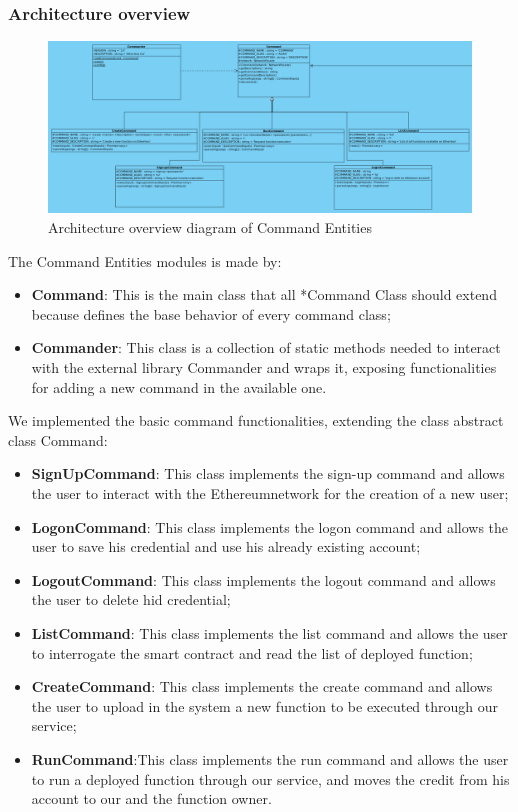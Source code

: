 \subsubsection{Architecture overview}
\begin{figure}[h]
	\centering
	\includegraphics[width=\textwidth]{./res/img/CommandEntities.png}
	\caption{Architecture overview diagram of Command Entities}
\end{figure}
\noindent The Command Entities modules is made by:
\begin{itemize}
    \item \textbf{Command}: This is the main class that all *Command Class should extend because defines the base behavior of every command class;
    \item \textbf{Commander}: This class is a collection of static methods needed to interact with the external library Commander and wraps it, exposing functionalities for adding a new command in the available one.
\end{itemize}
We implemented the basic command functionalities, extending the class abstract class Command:
\begin{itemize}
    \item \textbf{SignUpCommand}: This class implements the sign-up command and allows the user to interact with the Ethereum\glo network for the creation of a new user;
    \item \textbf{LogonCommand}: This class implements the logon command and allows the user to save his credential and use his already existing account;
    \item \textbf{LogoutCommand}: This class implements the logout command and allows the user to delete hid credential;
    \item \textbf{ListCommand}: This class implements the list command and allows the user to interrogate the smart contract and read the list of deployed function;
    \item \textbf{CreateCommand}: This class implements the create command and allows the user to upload in the system a new function to be executed through our service;
    \item \textbf{RunCommand}:This class implements the run command and allows the user to run a deployed function through our service, and moves the credit from his account to our and the function owner.
\end{itemize}
